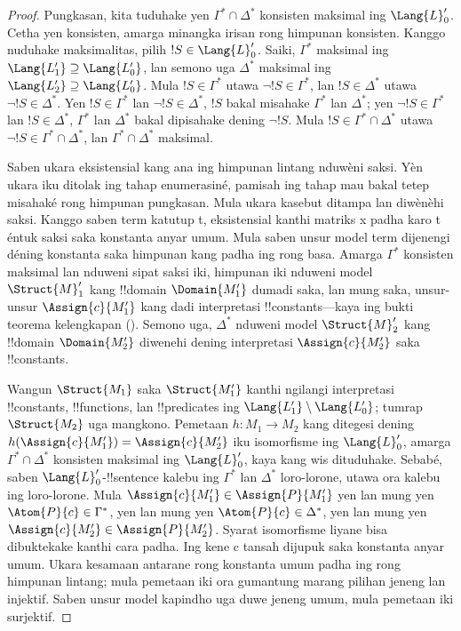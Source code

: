 \documentclass[../../../include/open-logic-section]{subfiles}
\begin{document}
\begin{proof}
Pungkasan, kita tuduhake yen $\Gamma^* \cap \Delta^*$
konsisten maksimal ing $\Lang{L}'_0$. Cetha yen konsisten,
amarga minangka irisan rong himpunan konsisten.
Kanggo nuduhake maksimalitas, pilih $!S \in \Lang{L}'_0$.
Saiki, $\Gamma^*$ maksimal ing $\Lang{L'_1}
\supseteq \Lang{L'_0}$, lan semono uga $\Delta^*$
maksimal ing $\Lang{L'_2} \supseteq \Lang{L'_0}$.
Mula $!S \in \Gamma^*$ utawa $\lnot !S \in \Gamma^*$,
lan $!S \in \Delta^*$ utawa $\lnot !S \in \Delta^*$.
Yen $!S \in \Gamma^*$ lan $\lnot !S \in \Delta^*$,
$!S$ bakal misahake $\Gamma^*$ lan $\Delta^*$;
yen $\lnot !S \in \Gamma^*$ lan $!S \in \Delta^*$,
$\Gamma^*$ lan $\Delta^*$ bakal dipisahake
dening $\lnot !S$.
Mula $!S \in \Gamma^* \cap \Delta^*$ utawa
$\lnot !S \in \Gamma^* \cap \Delta^*$,
lan $\Gamma^* \cap \Delta^*$ maksimal.

Saben ukara eksistensial kang ana ing himpunan lintang nduwèni saksi. Yèn ukara iku ditolak ing tahap enumerasiné, pamisah ing tahap mau bakal tetep misahaké rong himpunan pungkasan. Mula ukara kasebut ditampa lan diwènèhi saksi. Kanggo saben term katutup t, eksistensial kanthi matriks x padha karo t éntuk saksi saka konstanta anyar umum. Mula saben unsur model term dijenengi déning konstanta saka himpunan kang padha ing rong basa.
Amarga $\Gamma^*$ konsisten maksimal lan nduweni sipat saksi iki, himpunan iki nduweni
model $\Struct{M}'_1$ kang !!{domain} $\Domain{M'_1}$
dumadi saka, lan mung saka, unsur-unsur $\Assign{c}{M'_1}$
kang dadi interpretasi !!{constant}s---kaya ing bukti
teorema kelengkapan
().
Semono uga, $\Delta^*$ nduweni model $\Struct{M}'_2$
kang !!{domain} $\Domain{M'_2}$ diwenehi dening
interpretasi $\Assign{c}{M'_2}$ saka !!{constant}s.

Wangun $\Struct{M_1}$ saka $\Struct{M'_1}$ kanthi
ngilangi interpretasi !!{constant}s, !!{function}s,
lan !!{predicate}s ing $\Lang{L'_1} \setminus
\Lang{L'_0}$; tumrap $\Struct{M_2}$ uga mangkono.
Pemetaan $h \colon M_1 \to M_2$ kang ditegesi dening
$h(\Assign{c}{M'_1}) = \Assign{c}{M'_2}$ iku
isomorfisme ing $\Lang{L}'_0$, amarga
$\Gamma^* \cap \Delta^*$ konsisten maksimal ing
$\Lang{L}'_0$, kaya kang wis dituduhake.
Sebabé, saben $\Lang{L}'_0$-!!{sentence}
kalebu ing $\Gamma^*$ lan $\Delta^*$ loro-lorone,
utawa ora kalebu ing loro-lorone. Mula
$\Assign{c}{M'_1} \in \Assign{P}{M'_1}$ yen lan
mung yen $\Atom{P}{c} \in \Gamma^*$, yen lan mung yen
$\Atom{P}{c} \in \Delta^*$, yen lan mung yen
$\Assign{c}{M'_2} \in \Assign{P}{M'_2}$.
Syarat isomorfisme liyane bisa dibuktekake kanthi cara padha. Ing kene c tansah dijupuk saka konstanta anyar umum. Ukara kesamaan antarane rong konstanta umum padha ing rong himpunan lintang; mula pemetaan iki ora gumantung marang pilihan jeneng lan injektif. Saben unsur model kapindho uga duwe jeneng umum, mula pemetaan iki surjektif.


\end{proof}
\end{document}
